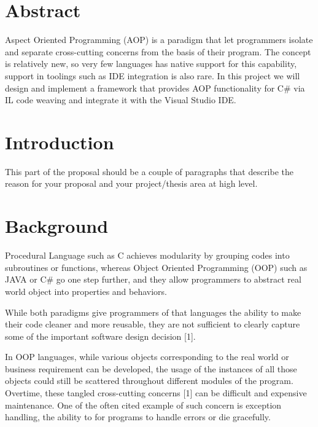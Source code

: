 \section*{Abstract}
Aspect Oriented Programming (AOP) is a paradigm that let programmers isolate and separate cross-cutting concerns from the basis of their program. The concept is relatively new, so very few languages has native support for this capability, support in toolings such as IDE integration is also rare. In this project we will design and implement a framework that provides AOP functionality for C\# via IL code weaving and integrate it with the Visual Studio IDE.
\vfill{}

\setcounter{page}{0} 
\newpage{}

\section{Introduction}
This part of the proposal should be a couple of paragraphs that
describe the reason for your proposal and your project/thesis area at
high level.

\section{Background}
Procedural Language such as C achieves modularity by grouping codes into subroutines or functions, whereas Object Oriented Programming (OOP) such as JAVA or C\# go one step further, and they allow programmers to abstract real world object into properties and behaviors.

While both paradigms give programmers of that languages the ability to make their code cleaner and more reusable, they are not sufficient to clearly capture some of the important software design decision [1].

In OOP languages, while various objects corresponding to the real world or business requirement can be developed, the usage of the instances of all those objects could still be scattered throughout different modules of the program. Overtime, these tangled cross-cutting concerns [1] can be difficult and expensive maintenance. One of the often cited example of such concern is exception handling, the ability to for programs to handle errors or die gracefully.

